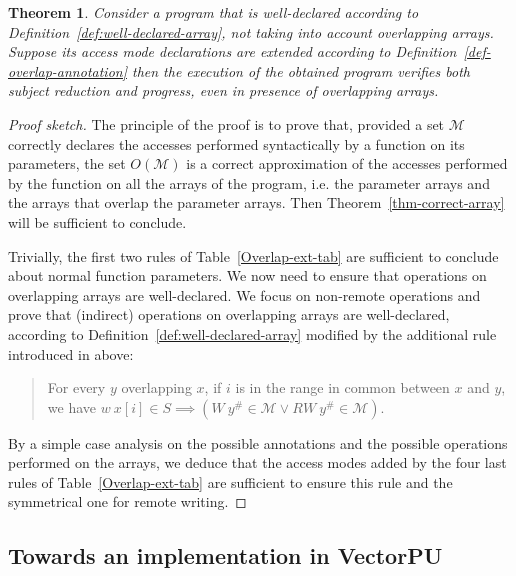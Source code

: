 \documentclass[preprint,12pt]{elsarticle}
\newtheorem{Theorem}{Theorem}
\newcommand{\abs}[1]{#1^\#}
\newcommand{\AM}{\mathcal{M}}
\newcommand{\Overlap}[1]{O(#1)}
\begin{document}
\begin{Theorem}\label{thm-correct-array-overlap}
Consider a program that is well-declared according to Definition~\ref{def:well-declared-array}, not taking into account  overlapping arrays. Suppose its access mode declarations are extended according to Definition~\ref{def-overlap-annotation} then the execution of the obtained program verifies both subject reduction and progress, even in presence of overlapping arrays.
\end{Theorem}

\begin{proof}[Proof sketch]
The principle of the proof is to prove that, provided a set $\AM$ correctly declares the accesses performed syntactically by a function on its parameters, the set $\Overlap \AM$ is a correct approximation of the accesses performed by the function on all the arrays of the program, i.e. the parameter arrays and the arrays that overlap the parameter arrays. Then Theorem~\ref{thm-correct-array} will be  sufficient to conclude.

Trivially, the first two rules of Table~\ref{Overlap-ext-tab} are sufficient to conclude about normal function parameters. We now need to ensure that operations on overlapping arrays are well-declared. We focus on non-remote operations and prove that (indirect) operations on overlapping arrays are well-declared, according to Definition~\ref{def:well-declared-array} modified by the additional rule introduced in above: 
\begin{quote}
For every $y$ overlapping $x$, if $i$ is in the range in common between $x$ and $y$, we have $w\ x[i]\in S \implies (W\ \abs y \in \AM \lor RW\ \abs y \in \AM)$.
\end{quote}
By a simple case analysis on the possible annotations and the possible operations performed on the arrays, we deduce that the access modes added by the four last rules of Table~\ref{Overlap-ext-tab} are sufficient to ensure this rule and the symmetrical one for remote writing.
\end{proof}



\subsection{Towards an implementation in VectorPU}
\end{document}
